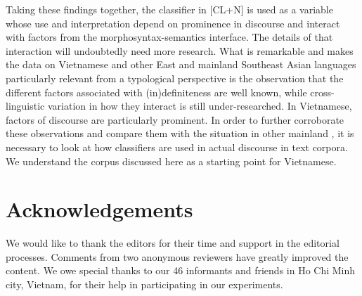 \documentclass[output=paper]{langsci/langscibook}
\begin{document}
Taking these findings together, the classifier in [CL+N] is used as a variable whose use and interpretation depend on prominence in discourse and interact with factors from the morphosyntax-semantics interface. The details of that interaction will undoubtedly need more research. What is remarkable and makes the data on Vietnamese and other East  and mainland Southeast Asian languages  particularly relevant from a typological perspective is the observation that the different factors associated with (in)definiteness are well known, while cross-linguistic variation in how they interact is still under-researched. In Vietnamese, factors of discourse are particularly prominent. In order to further corroborate these observations and compare them with the situation in other mainland , it is necessary to look at how classifiers are used in actual discourse in text corpora. We understand the corpus discussed here as a starting point for Vietnamese.

\section*{Acknowledgements}
We would like to thank the editors for their time and support in the editorial processes. Comments from two anonymous reviewers have greatly improved the content. We owe special thanks to our 46 informants and friends in Ho Chi Minh city, Vietnam, for their help in participating in our experiments.

{\sloppy\printbibliography[heading=subbibliography,notkeyword=this]}
\end{document}
